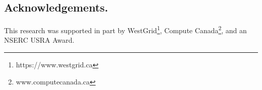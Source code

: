 \documentclass[twoside,11pt]{article}
\begin{document}
\subsection{Acknowledgements.}

	This research was supported in part by WestGrid\footnote{https://www.westgrid.ca}, Compute Canada\footnote{www.computecanada.ca},
and an NSERC USRA Award. 




%
%
%
%
%
%
%
%
\end{document}
